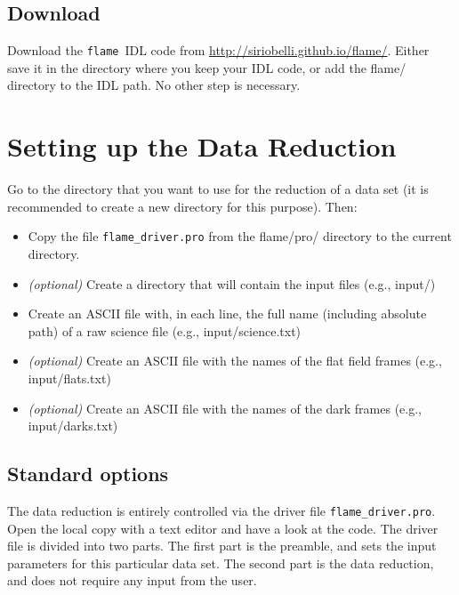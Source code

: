 \documentclass[a4paper, notitlepage]{article}
\newcommand{\flame}{\texttt{flame}}
\begin{document}
\subsection{Download}

Download the \flame\ IDL code from \url{http://siriobelli.github.io/flame/}. Either save it in the directory where you keep your IDL code, or add the flame/ directory to the IDL path. No other step is necessary.




\section{Setting up the Data Reduction}

Go to the directory that you want to use for the reduction of a data set (it is recommended to create a new directory for this purpose). Then:
\begin{itemize}
\item Copy the file \texttt{flame\_driver.pro} from the flame/pro/ directory to the current directory.
\item \emph{(optional)} Create a directory that will contain the input files (e.g., input/)
\item Create an ASCII file with, in each line, the full name (including absolute path) of a raw science file (e.g., input/science.txt)
\item \emph{(optional)} Create an ASCII file with the names of the flat field frames (e.g., input/flats.txt)
\item \emph{(optional)} Create an ASCII file with the names of the dark frames (e.g., input/darks.txt)
\end{itemize}


\subsection{Standard options}

The data reduction is entirely controlled via the driver file \texttt{flame\_driver.pro}. Open the local copy with a text editor and have a look at the code. The driver file is divided into two parts. The first part is the preamble, and sets the input parameters for this particular data set. The second part is the data reduction, and does not require any input from the user.
\end{document}
